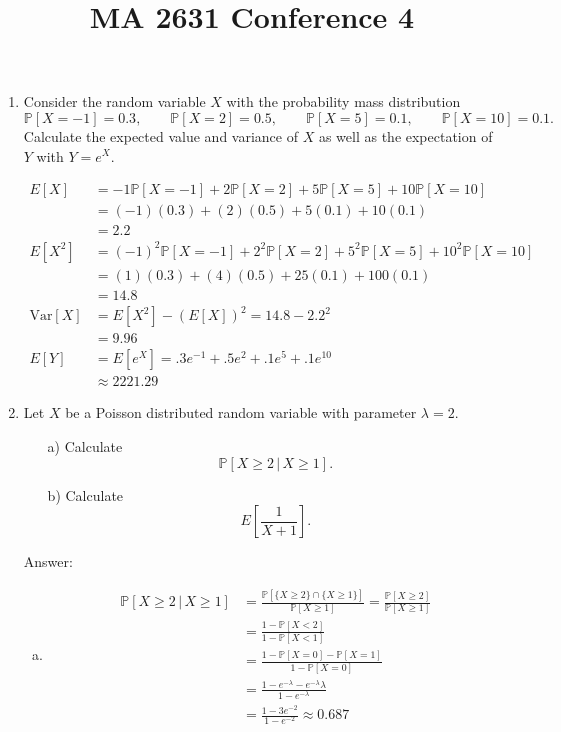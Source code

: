 \documentclass{article}
\title{MA 2631 Conference 4}
\begin{document}
\maketitle
\begin{enumerate}

\item

Consider the random variable $X$ with the probability mass distribution
\[
\mathbb{P}[X= -1] = 0.3, \qquad \mathbb{P}[X = 2] = 0.5, \qquad \mathbb{P}[X = 5] = 0.1, \qquad \mathbb{P}[X=10] = 0.1.
\]
Calculate the expected value and variance of $X$ as well as the expectation of $Y$ with $Y = e^{X}$.

\begin{align*}
E[X] &= -1\mathbb{P}[X= -1] + 2\mathbb{P}[X= 2] + 5\mathbb{P}[X= 5] + 10\mathbb{P}[X= 10]\\
&= (-1)(0.3) + (2)(0.5) + 5(0.1) + 10(0.1) \\
&= \boxed{2.2} \\
E[X^2] &= (-1)^2\mathbb{P}[X= -1] + 2^2\mathbb{P}[X= 2] + 5^2\mathbb{P}[X= 5] + 10^2\mathbb{P}[X= 10]\\
&= (1)(0.3) + (4)(0.5) + 25(0.1) + 100(0.1) \\
&= 14.8\\
\text{Var}[X] &= E[X^2] - (E[X])^2 = 14.8 - 2.2^2\\
&= \boxed{9.96}\\
E[Y] &= E[e^X] = .3e^{-1} + .5e^2 + .1e^5 + .1e^{10} \\
&\approx \boxed{2221.29}
\end{align*}

\newpage

\item
Let $X$ be a Poisson distributed random variable with parameter $\lambda =2$.
\begin{itemize}
	\item[a)] Calculate
	\[
	\mathbb{P}\left[X \geq 2 \, \vert \, X \geq 1\right].
	\]
	\item[b)] Calculate
	\[
	E\left[ \frac{1}{X+1}\right].
	\]
\end{itemize}

Answer:

\begin{enumerate}[a)]
\item

\begin{align*}
\mathbb{P}\left[X \geq 2 \, \vert \, X \geq 1\right]
&= \frac{\mathbb{P}[\{X \geq 2\} \cap \{X \geq 1\}]}{\mathbb{P}[X \geq 1]}
=\frac{\mathbb{P}[X \geq 2]}{\mathbb{P}[X \geq 1]}\\
&= \frac{1 - \mathbb{P}[X < 2]}{1 - \mathbb{P}[X < 1]}\\
&= \frac{1- \mathbb{P}[X = 0] - \mathbb{P}[X = 1]}{1- \mathbb{P}[X = 0]} \\
&= \frac{1 - e^{-\lambda} - e^{-\lambda}\lambda}{1-e^{-\lambda}}\\
&= \boxed{\frac{1 - 3e^{-2}}{1-e^{-2}} \approx 0.687}
\end{align*}


\end{enumerate}
\end{enumerate}
\end{document}
